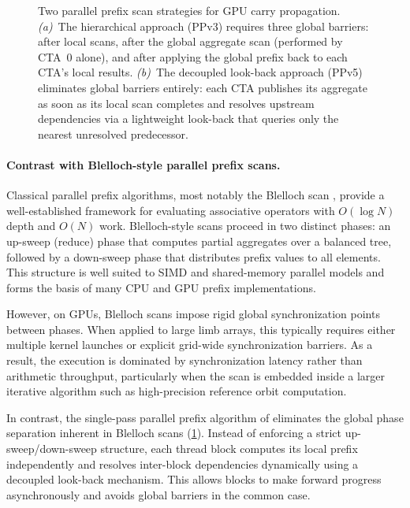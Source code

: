 \begin{figure}[!htbp]
\caption[Hierarchical vs.\ decoupled look-back parallel prefix]{%
  Two parallel prefix scan strategies for GPU carry propagation.
  \emph{(a)}~The hierarchical approach (PPv3) requires three global
   barriers: after local scans, after the global
  aggregate scan (performed by CTA~0 alone), and after applying the
  global prefix back to each CTA's local results.
  \emph{(b)}~The decoupled look-back approach (PPv5) eliminates global
  barriers entirely: each CTA publishes its aggregate as soon as its
  local scan completes and resolves upstream dependencies via a
  lightweight look-back that queries only the nearest unresolved
  predecessor.}
\label{fig:prefix-scan-comparison}
\end{figure}

\paragraph{Contrast with Blelloch-style parallel prefix scans.}

Classical parallel prefix algorithms, most notably the Blelloch
scan \cite{Blelloch1990PrefixSums}, provide a
well-established framework for evaluating associative operators with
$O(\log N)$ depth and $O(N)$ work. Blelloch-style scans proceed in two distinct
phases: an up-sweep (reduce) phase that computes partial aggregates over a
balanced tree, followed by a down-sweep phase that distributes prefix values to
all elements. This structure is well suited to SIMD and shared-memory parallel
models and forms the basis of many CPU and GPU prefix implementations.

However, on GPUs, Blelloch scans impose rigid global synchronization points
between phases. When applied to large limb arrays, this typically requires
either multiple kernel launches or explicit grid-wide synchronization barriers.
As a result, the execution is dominated by synchronization latency rather than
arithmetic throughput, particularly when the scan is embedded inside a larger
iterative algorithm such as high-precision reference orbit computation.

In contrast, the single-pass parallel prefix algorithm
of \cite{merrill2016single} eliminates the global phase separation inherent in
Blelloch scans (\cref{fig:prefix-scan-comparison}). Instead of enforcing a strict up-sweep/down-sweep structure,
each thread block computes its local prefix independently and resolves
inter-block dependencies dynamically using a decoupled look-back mechanism. This
allows blocks to make forward progress asynchronously and avoids global barriers
in the common case.

